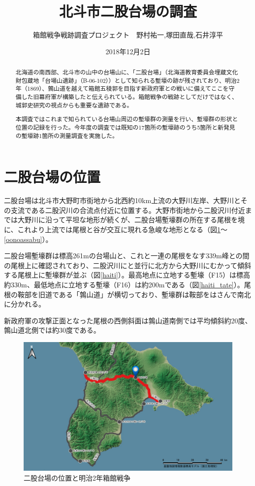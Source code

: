 \documentclass[14Q]{jsarticle}
\title{北斗市二股台場の調査}%
\date{2018年12月2日}
\author{箱館戦争戦跡調査プロジェクト　野村祐一,塚田直哉,石井淳平}              %
\begin{document}
\maketitle
\begin{abstract}
北海道の南西部、北斗市の山中の台場山に、「二股台場」（北海道教育委員会埋蔵文化財包蔵地「台場山遺跡」（B-06-102））として知られる塹壕の跡が残されており、明治2年（1869）、鶉山道を越えて箱館五稜郭を目指す新政府軍との戦いに備えてここを守備した旧幕府軍が構築したと伝えられている。箱館戦争の戦跡としてだけではなく、城郭史研究の視点からも重要な遺跡である。

本調査ではこれまで知られている台場山周辺の塹壕群の測量を行い、塹壕群の形状と位置の記録を行った。今年度の調査では既知の17箇所の塹壕跡のうち5箇所と新発見の塹壕跡1箇所の測量調査を実施した。
\end{abstract}

\section{二股台場の位置}
二股台場は北斗市大野町市街地から北西約10km上流の大野川左岸、大野川とその支流である二股沢川の合流点付近に位置する。大野市街地から二股沢川付近までは大野川に沿って平坦な地形が続くが、二股台場塹壕群の所在する尾根を境に、これより上流では尾根と谷が交互に現れる急峻な地形となる（図\ref{dounan}〜\ref{oonoassabu}）。

二股台場塹壕群は標高261mの台場山と、これと一連の尾根をなす339m峰との間の尾根上に確認されており、二股沢川にと並行に北方から大野川にむかって傾斜する尾根上に塹壕群が並ぶ（図\ref{haiti}）。最高地点に立地する塹壕（F15）は標高約330m、最低地点に立地する塹壕（F16）は約200mである（図\ref{haiti_tate}）。尾根の鞍部を旧道である「鶉山道」が横切っており、塹壕群は鞍部をはさんで南北に分かれる。

新政府軍の攻撃正面となった尾根の西側斜面は鶉山道南側では平均傾斜約20度、鶉山道北側では約30度である。

\begin{figure}[h]
\centering
\includegraphics[width=160truemm]{fig/dounan.pdf}
\caption{二股台場の位置と明治2年箱館戦争}
\label{dounan}
\end{figure}
\end{document}
